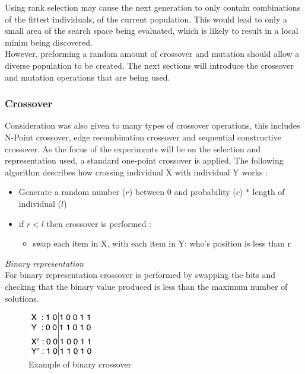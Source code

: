 \documentclass[10pt,a4paper,openbib]{article}
\begin{document}
\begin{multicols}{2}
\noindent Using rank selection may cause the next generation to only contain combinations of the fittest individuals, of the current population. This would lead to only a small area of the search space being evaluated, which is likely to result in a local minim being discovered. \\

\noindent However, preforming a random amount of crossover and mutation should allow a diverse population to be created. The next sections will introduce the crossover and mutation operations that are being used.


\subsubsection{Crossover} \label{crossoverExplained}

Consideration was also given to many types of crossover operations, this includes N-Point crossover, edge recombination crossover and sequential constructive crossover.\cite{ahmed2010genetic} As the focus of the experiments will be on the selection and representation used, a standard one-point crossover is applied. \cite{poli1998schema}  The following algorithm describes how crossing individual X with individual Y works : \\
\begin{itemize}
\item Generate a random number ($r$) between $0$ and probability ($c$) $*$ length of individual ($l$)
\item if $r < l$ then crossover is performed :
	\begin{itemize}
	\item swap each item in X, with each item in Y: who's position is less than r 
	\end{itemize}
\end{itemize}

\noindent \textit{Binary representation} \\

\noindent For binary representation crossover is performed by swapping the bits and checking that the binary value produced is less than the maximum number of solutions. 

\begin{figure}[H]
\begin{center}
\includegraphics[scale=0.6]{images/binaryCrossover.png} 
\caption{Example of binary crossover}
\label{fig:binaryCrossover}
\end{center}
\end{figure}



\end{multicols}
\end{document}
